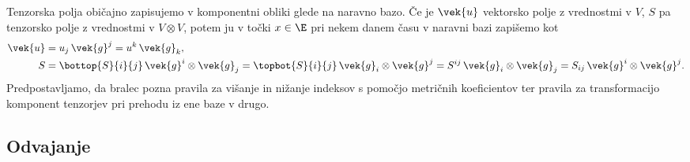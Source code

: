 Tenzorska polja običajno zapisujemo v komponentni obliki glede na naravno bazo. Če je
$\vek{u}$ vektorsko polje z vrednostmi v $V$, $S$ pa tenzorsko polje z vrednostmi v $V\otimes V$,
potem ju v točki $x\in\E$ pri nekem danem času v naravni bazi zapišemo kot
\begin{align*}
	\vek{u}&=u_j\,\vek{g}^j=u^k\,\vek{g}_k,\\
	S&=\bottop{S}{i}{j}\,\vek{g}^i\otimes\vek{g}_j=\topbot{S}{i}{j}\,\vek{g}_i\otimes\vek{g}^j=
	S^{ij}\,\vek{g}_i\otimes\vek{g}_j=S_{ij}\,\vek{g}^i\otimes\vek{g}^j.
\end{align*}
Predpostavljamo, da bralec pozna pravila za višanje in nižanje indeksov s pomočjo metričnih koeficientov
ter pravila za transformacijo komponent tenzorjev pri prehodu iz ene baze v drugo.

\subsection{Odvajanje}

